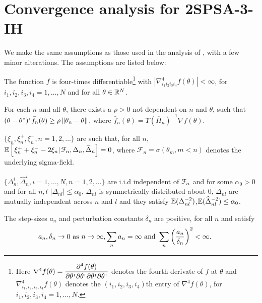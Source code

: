 \section{Convergence analysis for 2SPSA-3-IH}
\label{sec:2spsa-results}
We make the same assumptions as those used in the analysis of \cite{prashanth2015rdsa}, with a few minor alterations. The assumptions are listed below:
\begin{pvn}
\item  The function
$f$ is four-times differentiable\footnote{Here $\nabla^4 f(\theta) = \dfrac{\partial^4 f (\theta)}{\partial \theta^\mathsf{\scriptscriptstyle T} \partial \theta^\mathsf{\scriptscriptstyle T} \partial \theta^\mathsf{\scriptscriptstyle T} \partial \theta^\mathsf{\scriptscriptstyle T}}$ denotes the fourth derivate of $f$ at $\theta$ and $\nabla^4_{i_1, i_2, i_3, i_4} f(\theta)$ denotes the $(i_1, i_2, i_3, i_4)$th entry of $\nabla^4 f(\theta)$, for $i_1, i_2, i_3,i_4=1,\ldots, N$.} with $\left|\nabla^4_{i_1 i_2 i_3 i_4} f(\theta) \right| < \infty$, for $i_1, i_2, i_3,i_4=1,\ldots, N$ and for all $\theta\in \mathbb{R}^N$. 


\item For each $n$ and all $\theta$, there exists a $\rho>0$ not dependent on $n$ and $\theta$, such that $(\theta-\theta^*)^\mathsf{\scriptscriptstyle T} \bar f_n(\theta) \ge \rho \left\| \theta_n - \theta\right\|$, where $\bar f_n(\theta) = \Upsilon(\overline H_n)^{-1} \nabla f(\theta)$.

\item $\{\xi_n, \xi_n^+,\xi_n^-, n=1,2,\ldots\}$ are such that, for all $n$, $\mathbb{E}\left[\left. \xi_n^+ + \xi_n^- - 2 \xi_n \right| \mathcal{F}_n, \Delta_n, \widehat \Delta_n \right] = 0$, where $\mathcal{F}_n = \sigma(\theta_m,m < n)$ denotes the underlying sigma-field.

\item $\{\Delta_n^i,\widehat\Delta_n^i, i=1,\ldots,N, n=1,2,\ldots\}$ are i.i.d independent of $\mathcal{F}_n$ and for some $\alpha_0 > 0$ and for all $n,l$ $|\Delta_{nl}|\le \alpha_0$, $\Delta_{nl}$ is symmetrically distributed about 0, $\Delta_{nl}$ are mutually independent across $n$ and $l$ and they satisfy $\mathbb{E} (\Delta_{nl}^{-2})$,$\mathbb{E} (\widehat\Delta_{nl}^{-2}) \le \alpha_0$.

\item  The step-sizes $a_n$ and perturbation constants $\delta_n$ are positive, for all $n$ and satisfy
$$\hspace{-1.7em} a_n, \delta_n \rightarrow 0\text{ as } n \rightarrow \infty, 
\sum_n a_n=\infty \text{ and } \sum_n \left(\frac{a_n}{\delta_n}\right)^2 <\infty.$$


\end{pvn}
